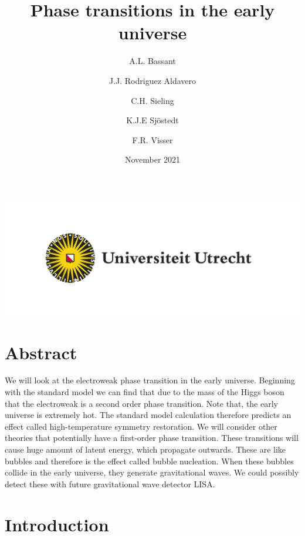 \documentclass{article}
\title{Phase transitions in the early universe}
\author{
  A.L. Bassant\\
  \and
  J.J. Rodriguez Aldavero\\
  \and
  C.H. Sieling\\
  \and
  K.J.E Sjöstedt\\
  \and
  F.R. Visser\\
}
\date{November 2021}
\numberwithin{equation}{section}
\begin{document}
\maketitle

\begin{center}
    \includegraphics[]{UU_logo_NL_RGB.jpg}
    \section*{Abstract}  
\end{center}

We will look at the electroweak phase transition in the early universe.
Beginning with the standard model we can find that due to the mass of the Higgs boson that the electroweak is a second order phase transition.
Note that, the early universe is extremely hot. 
The standard model calculation therefore predicts an effect called high-temperature symmetry restoration.
We will consider other theories that potentially have a first-order phase transition.
These transitions will cause huge amount of latent energy, which propagate outwards.
These are like bubbles and therefore is the effect called bubble nucleation.
When these bubbles collide in the early universe, they generate gravitational waves.
We could possibly detect these with future gravitational wave detector LISA.


\newpage


\tableofcontents


\section{Introduction}
\end{document}
